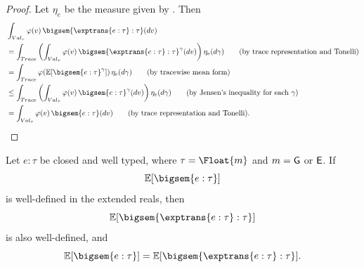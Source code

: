 \begin{proof}
  Let $\eta_e$ be the measure given by
  . Then
\begin{align}
&\int_{Val_\tau}
  \varphi(v)\,
  \bigsem{\exptrans{e:\tau}:\tau}(dv)
\notag
\\
&=
\int_{Trace}
  \left(
    \int_{Val_\tau}
      \varphi(v)\,
      \bigsem{\exptrans{e:\tau}:\tau}^{\gamma}(dv)
  \right)
  \eta_e(d\gamma)
\tag{\text{by trace representation and Tonelli}}
\\
&=
\int_{Trace}
  \varphi\!\left(
    \mathbb E[
      \bigsem{e:\tau}^{\gamma}
    ]
  \right)
  \eta_e(d\gamma)
\tag{\text{by tracewise mean form}}
\\
&\leq
\int_{Trace}
  \left(
    \int_{Val_\tau}
      \varphi(v)\,
      \bigsem{e:\tau}^{\gamma}(dv)
  \right)
  \eta_e(d\gamma)
\tag{\text{by Jensen's inequality for each $\gamma$}}
\\
&=
\int_{Val_\tau}
  \varphi(v)\,
  \bigsem{e:\tau}(dv)
\tag{\text{by trace representation and Tonelli}}.
\end{align}

\end{proof}


\begin{theorem}
  \label{thm:global-soundness-big-step}
  Let $e:\tau$ be closed and well typed, where
  $\tau=\Float{m}$ and $m=\mathsf{G}$ or $\mathsf{E}$.
  If
  \[
    \mathbb E[\bigsem{e:\tau}]
  \]
  is well-defined in the extended reals, then
  \[
    \mathbb E[\bigsem{\exptrans{e:\tau}:\tau}]
  \]
  is also well-defined, and
  \[
    \mathbb E[\bigsem{e:\tau}]
    =
    \mathbb E[\bigsem{\exptrans{e:\tau}:\tau}].
  \]
\end{theorem}

